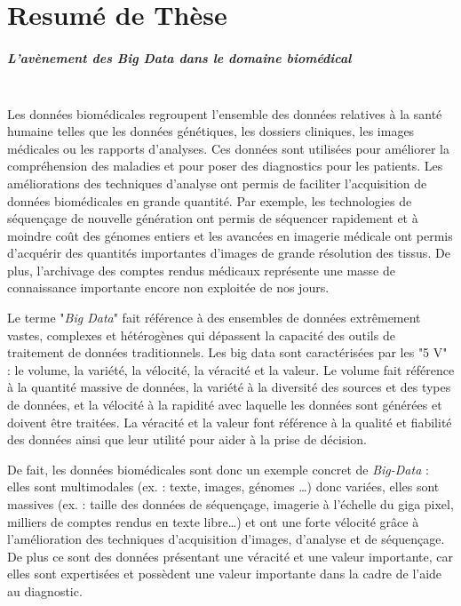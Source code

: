 \chapter{Resumé de Thèse}
\paragraph{\textbf{L’avènement des \textit{Big Data} dans le domaine biomédical}}\mbox{}\\

Les données biomédicales regroupent l’ensemble des données relatives à la santé humaine telles que les données génétiques, les dossiers cliniques, les images médicales ou les rapports d’analyses. Ces données sont utilisées pour améliorer la compréhension des maladies et pour poser des diagnostics pour les patients. Les améliorations des techniques d’analyse ont permis de faciliter l’acquisition de données biomédicales en grande quantité. Par exemple, les technologies de séquençage de nouvelle génération ont permis de séquencer rapidement et à moindre coût des génomes entiers et les avancées en imagerie médicale ont permis d'acquérir des quantités importantes d’images de grande résolution des tissus. De plus, l’archivage des comptes rendus médicaux représente une masse de connaissance importante encore non exploitée de nos jours.

Le terme "\textit{Big Data}" fait référence à des ensembles de données extrêmement vastes, complexes et hétérogènes qui dépassent la capacité des outils de traitement de données traditionnels. Les big data sont caractérisées par les "5 V" : le volume, la variété, la vélocité, la véracité et la valeur. Le volume fait référence à la quantité massive de données, la variété à la diversité des sources et des types de données, et la vélocité à la rapidité avec laquelle les données sont générées et doivent être traitées. La véracité et la valeur font référence à la qualité et fiabilité des données ainsi que leur utilité pour aider à la prise de décision.

De fait, les données biomédicales sont donc un exemple concret de \textit{Big-Data} : elles sont multimodales (ex. : texte, images, génomes …) donc variées, elles sont massives (ex. : taille des données de séquençage, imagerie à l’échelle du giga pixel, milliers de comptes rendus en texte libre…) et ont une forte vélocité grâce à l’amélioration des techniques d’acquisition d’images, d’analyse et de séquençage. De plus ce sont des données présentant une véracité et une valeur importante, car elles sont expertisées et possèdent une valeur importante dans la cadre de l’aide au diagnostic.

